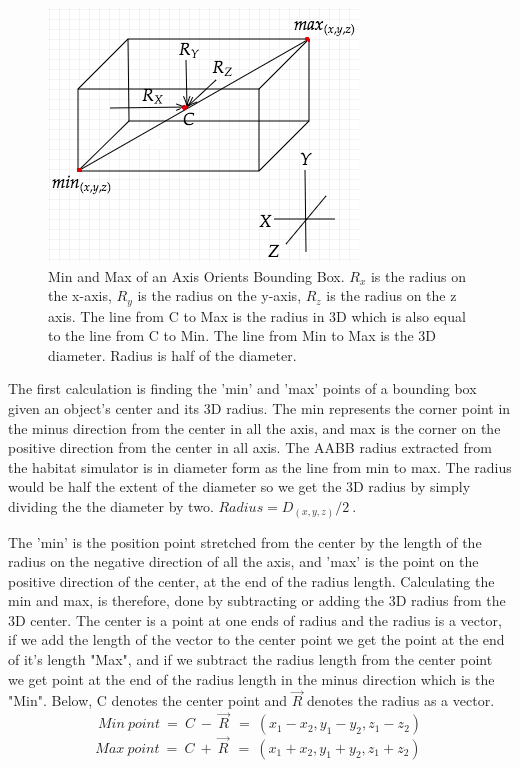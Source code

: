\begin{figure}[H]
\centering
\includegraphics[scale=0.5]{images/Geoinfo.png}
\caption{Min and Max of an Axis Orients Bounding Box. $R_{x}$ is the radius on the x-axis, $R_{y}$ is the radius on the y-axis, $R_{z}$ is the radius on the z axis. The line from C to Max is the radius in 3D which is also equal to the line from C to Min. The line from Min to Max is the 3D diameter. Radius is half of the diameter.}
\label{fig:aabb}
\end{figure}

The first calculation is finding the 'min' and 'max' points of a bounding box given an object's center and its 3D radius. The min represents the corner point in the minus direction from the center in all the axis, and max is the corner on the positive direction from the center in all axis. 
The AABB radius extracted from the habitat simulator is in diameter form as the line from min to max. The radius would be half the extent of the diameter so we get the 3D radius by simply dividing the the diameter by two. $ Radius = D_(x,y,z) /2\ $. 

The 'min' is the position point stretched from the center by the length of the radius on the negative direction of all the axis, and 'max' is the point on the positive direction of the center, at the end of the radius length. Calculating the min and max, is therefore, done by subtracting or adding the 3D radius from the 3D center. The center is a point at one ends of radius and the radius is a vector, if we add the length of the vector to the center point we get the point at the end of it's length "Max", and if we subtract the radius length from the center point we get point at the end of the radius length in the minus direction which is the "Min". Below, C denotes the center point and $\vec{R}$ denotes the radius as a vector.  
\[
Min\ point\ =\ C\ -\ \vec{R} \ \ =\ ( x_{1} -x_{2}, y_{1} - y_{2} , z_{1} - z_{2}{}) \] 
\[
Max\ point\ =\ C\ +\ \vec{R} \ \ =\ ( x_{1} + x_{2}, y_{1} + y_{2}, z_{1} + z_{2}{}) \ 
\]

